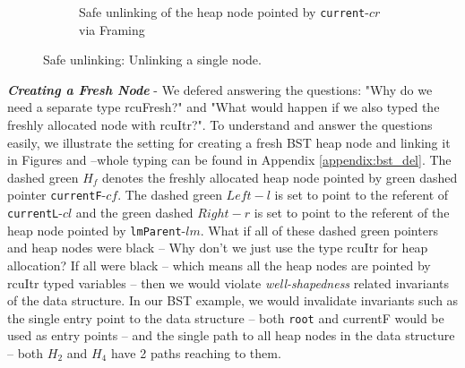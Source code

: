 \begin{figure}[H]
\begin{subfigure}[b]{.4\linewidth}

 \caption{Safe unlinking of the heap node pointed by \texttt{current}-$cr$ via \textsf{Framing}}
 \label{fig:bunlinkframeout}
 \end{subfigure}
 \caption{Safe unlinking: Unlinking a single node.}\vspace{-2mm}
 \end{figure}
\textit{\textbf{Creating a Fresh Node}} - We defered answering the questions: "Why do we need a separate type \textsf{rcuFresh}?" and "What would happen if we also typed the freshly allocated node with \textsf{rcuItr}?". To understand and answer the questions easily, we illustrate the setting for creating a fresh \textsf{BST} heap node and linking it in Figures \label{fig:frframeout} and \label{fig:freshframeout} --whole typing can be found in Appendix \ref{appendix:bst_del}. The dashed green $H_f$ denotes the freshly allocated heap node pointed by green dashed pointer \texttt{currentF}-$cf$. The dashed green $Left-l$ is set to point to the referent of \texttt{currentL}-$cl$ and the green dashed $Right-r$ is set to point to the referent of the heap node pointed by \texttt{lmParent}-$lm$. What if all of these dashed green pointers and heap nodes were black -- Why don't we just use the type \textsf{rcuItr} for heap allocation? If all were black -- which means all the heap nodes are pointed by \textsf{rcuItr} typed variables -- then we would violate \textit{well-shapedness} related invariants of the data structure. In our \textsf{BST} example, we would invalidate invariants such as the single entry point to the data structure -- both \texttt{root} and \textsf{currentF} would be used as entry points -- and the single path to all heap nodes in the data structure -- both $H_2$ and $H_4$ have 2 paths reaching to them. 
